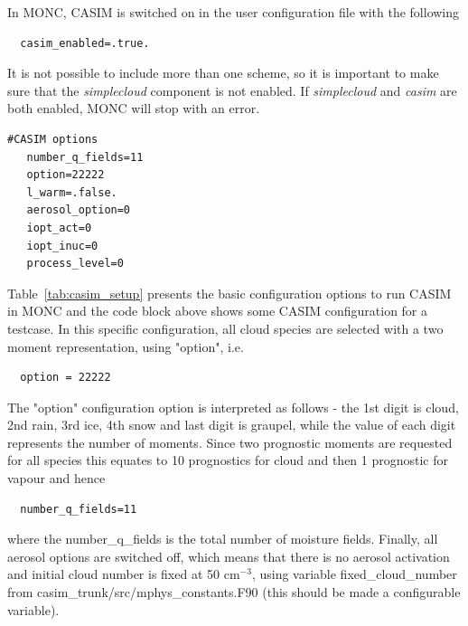\documentclass[a4paper,11pt]{article}
\begin{document}
In MONC, CASIM is switched on in the user configuration file with the following
\begin{lstlisting}
  casim_enabled=.true.
\end{lstlisting}
It is not possible to include more than one scheme, so it is important to
make sure that the \emph{simplecloud} component is not enabled. If \emph{simplecloud}
and \emph{casim} are both enabled, MONC will stop with an error.
\begin{lstlisting}[caption={Example configuration snippet for CASIM settings.
   Taken from testcases/stratus/fire\_sc\_casim.mcf}]
   #CASIM options
   number_q_fields=11
   option=22222
   l_warm=.false.
   aerosol_option=0
   iopt_act=0
   iopt_inuc=0
   process_level=0
\end{lstlisting}
Table~\ref{tab:casim_setup} presents the basic configuration options to run CASIM in MONC and
the code block above shows some CASIM configuration for a testcase. In this specific configuration, all cloud species are selected with a two moment representation, using "option", i.e. 
\begin{lstlisting}
  option = 22222
\end{lstlisting}
The "option" configuration option is interpreted as follows - the 1st digit is cloud,
2nd rain, 3rd ice, 4th snow and last digit is graupel, while the value of each digit
represents the number of moments. Since two prognostic moments are requested for
all species this equates to 10 prognostics for cloud and then 1 prognostic for
vapour and hence
\begin{lstlisting}
  number_q_fields=11
\end{lstlisting}
where the number\_q\_fields is the total number of moisture fields. Finally, all
aerosol options are switched off, which means that there is no aerosol activation
and initial cloud number is fixed at 50 cm$^{-3}$, using variable fixed\_cloud\_number
from casim\_trunk/src/mphys\_constants.F90 (this should be made a configurable
variable).
\end{document}
